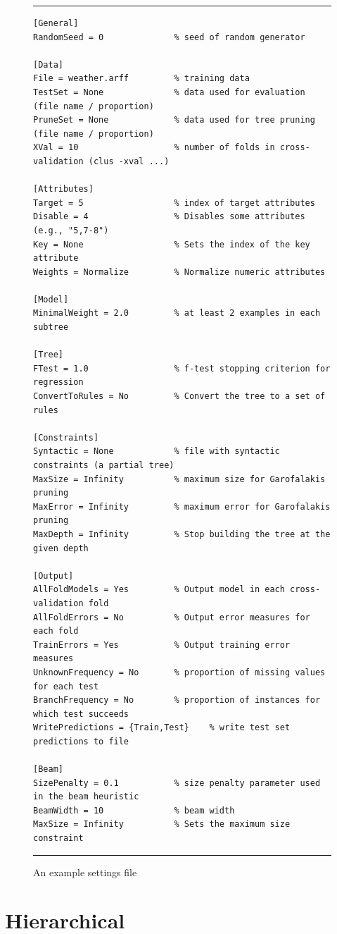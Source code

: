 \documentclass[a4paper]{report}
\begin{document}
\begin{figure}[tb]
\hrule
\begin{verbatim}
[General]
RandomSeed = 0              % seed of random generator

[Data]
File = weather.arff         % training data
TestSet = None              % data used for evaluation (file name / proportion)
PruneSet = None             % data used for tree pruning (file name / proportion)
XVal = 10                   % number of folds in cross-validation (clus -xval ...)

[Attributes]
Target = 5                  % index of target attributes
Disable = 4                 % Disables some attributes (e.g., "5,7-8")
Key = None                  % Sets the index of the key attribute
Weights = Normalize         % Normalize numeric attributes

[Model]
MinimalWeight = 2.0         % at least 2 examples in each subtree
         
[Tree]
FTest = 1.0                 % f-test stopping criterion for regression
ConvertToRules = No         % Convert the tree to a set of rules

[Constraints]
Syntactic = None            % file with syntactic constraints (a partial tree)
MaxSize = Infinity          % maximum size for Garofalakis pruning
MaxError = Infinity         % maximum error for Garofalakis pruning
MaxDepth = Infinity         % Stop building the tree at the given depth

[Output]
AllFoldModels = Yes         % Output model in each cross-validation fold
AllFoldErrors = No          % Output error measures for each fold
TrainErrors = Yes           % Output training error measures
UnknownFrequency = No       % proportion of missing values for each test
BranchFrequency = No        % proportion of instances for which test succeeds
WritePredictions = {Train,Test}    % write test set predictions to file

[Beam]
SizePenalty = 0.1           % size penalty parameter used in the beam heuristic
BeamWidth = 10              % beam width
MaxSize = Infinity          % Sets the maximum size constraint
\end{verbatim}
\hrule
\caption{An example settings file}
\label{settings:fig}
\end{figure}


\section{Hierarchical}
\end{document}
